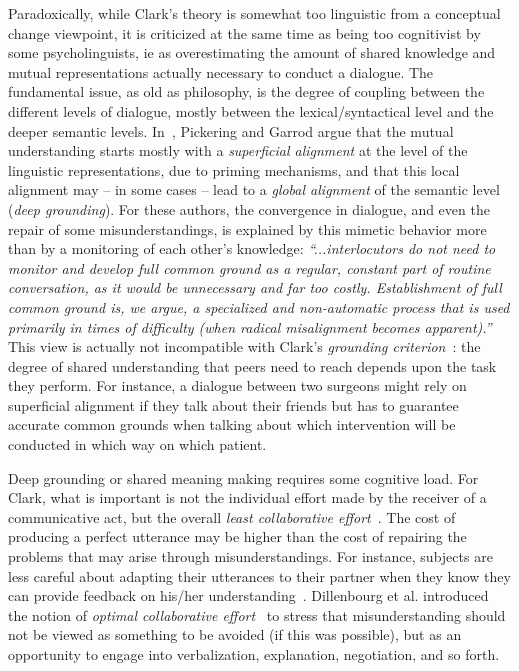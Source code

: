 \documentclass[11pt,a4paper]{report}
\begin{document}
Paradoxically, while Clark's theory is somewhat too linguistic from a conceptual
change viewpoint, it is criticized at the same time as being too cognitivist by
some psycholinguists, ie as overestimating the amount of shared knowledge and
mutual representations actually necessary to conduct a dialogue. The fundamental
issue, as old as philosophy, is the degree of coupling between the different
levels of dialogue, mostly between the lexical/syntactical level and the deeper
semantic levels. In~\cite{pickering2006alignment}, Pickering and Garrod argue
that the mutual understanding starts mostly with a \emph{superficial alignment}
at the level of the linguistic representations, due to priming mechanisms, and
that this local alignment may -- in some cases -- lead to a \emph{global
alignment} of the semantic level (\emph{deep grounding}).  For these authors,
the convergence in dialogue, and even the repair of some misunderstandings, is
explained by this mimetic behavior more than by a monitoring of each other's
knowledge: \emph{``...interlocutors do not need to monitor and develop full
common ground as a regular, constant part of routine conversation, as it
would be unnecessary and far too costly. Establishment of full common ground
is, we argue, a specialized and non-automatic process that is used primarily
in times of difficulty (when radical misalignment becomes
apparent).''}~\cite{pickering2006alignment} This view is actually not
incompatible with Clark's \emph{grounding
criterion}~\cite{clark1989contributing}: the degree of shared understanding that
peers need to reach depends upon the task they perform. For instance, a dialogue
between two surgeons might rely on superficial alignment if they talk about
their friends but has to guarantee accurate common grounds when talking about
which intervention will be conducted in which way on which patient.

Deep grounding or shared meaning making requires some cognitive load. For Clark,
what is important is not the individual effort made by the receiver of a
communicative act, but the overall \emph{least collaborative
effort}~\cite{clark1986referring}.  The cost of producing a perfect utterance
may be higher than the cost of repairing the problems that may arise through
misunderstandings. For instance, subjects are less careful about adapting their
utterances to their partner when they know they can provide feedback on his/her
understanding~\cite{schober1993spatial}. Dillenbourg et al. introduced the
notion of \emph{optimal collaborative effort}~\cite{dillenbourg1995evolution} to
stress that misunderstanding should not be viewed as something to be avoided (if
this was possible), but as an opportunity to engage into verbalization,
explanation, negotiation, and so forth.
\end{document}
